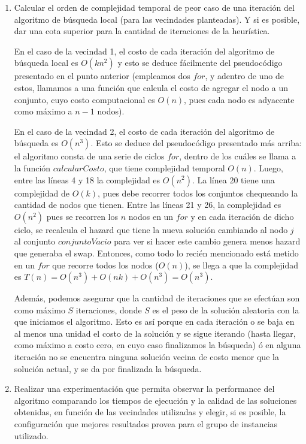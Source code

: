 \documentclass[11pt, a4paper, twoside]{article}
\begin{document}
\begin{enumerate}
		\item Calcular el orden de complejidad temporal de peor caso de una iteración del algoritmo de búsqueda local
			  (para las vecindades planteadas). Y si es posible, dar una cota superior para la cantidad de iteraciones
			  de la heurística. 
			  
			  En el caso de la vecindad 1, el costo de cada iteración del algoritmo de búsqueda local es $O(kn^2)$ y esto
			  se deduce fácilmente del pseudocódigo presentado en el punto anterior (empleamos dos $for$, y adentro de uno
			  de estos, llamamos a una función que calcula el costo de agregar el nodo a un conjunto, cuyo costo computacional
			  es $O(n)$, pues cada nodo es adyacente como máximo a $n-1$ nodos).
			  
			  En el caso de la vecindad 2, el costo de cada iteración del algoritmo de búsqueda es $ O(n^3) $. Esto se deduce
			  del pseudocódigo presentado más arriba: el algoritmo consta de una serie de ciclos $for$, dentro de los
			  cuáles se llama a la función $calcularCosto$, que tiene complejidad temporal $O(n)$. 
			  Luego, entre las líneas 4 y 18 la complejidad es $O(n^2)$. La línea 20 tiene una complejidad de $O(k)$, pues
			  debe recorrer todos los conjuntos chequeando la cantidad de nodos que tienen. Entre las líneas 21 y 26, la 
			  complejidad es $O(n^2)$ pues se recorren los $n$ nodos en un $for$ y en cada iteración de dicho ciclo, se 
			  recalcula el hazard que tiene la nueva solución cambiando al nodo $j$ al conjunto $conjuntoVacio$ para ver si
			  hacer este cambio genera menos hazard que generaba el swap. 
			  Entonces, como todo lo recién mencionado está metido en un $for$ que recorre todos los nodos ($O(n)$), 
			  se llega a que la complejidad es $T(n) = O(n^3) + O(nk) + O(n^3) = O(n^3) $.
			  
			  Además, podemos asegurar que la cantidad de iteraciones que se efectúan son como máximo $S$ iteraciones, 
			  donde $S$ es el peso de la solución aleatoria con la que iniciamos el algoritmo. Esto es así porque en cada
			  iteración o se baja en al menos una unidad el costo de la solución y se sigue iterando (hasta llegar, como 
			  máximo a costo cero, en cuyo caso finalizamos la búsqueda) ó en alguna iteración no se encuentra ninguna 
			  solución vecina de costo menor que la solución actual, y se da por finalizada la búsqueda.
			  
	    \item Realizar una experimentación que permita observar la performance del algoritmo comparando los tiempos
			  de ejecución y la calidad de las soluciones obtenidas, en función de las vecindades utilizadas y elegir,
			  si es posible, la configuración que mejores resultados provea para el grupo de instancias utilizado.
    \end{enumerate}
\end{document}
